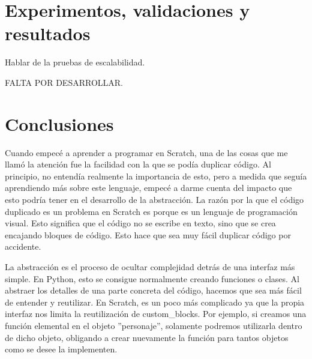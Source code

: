\documentclass[a4paper, 12pt]{book}
\begin{document}



\cleardoublepage
\chapter{Experimentos, validaciones y resultados}


Hablar de la pruebas de escalabilidad. 

FALTA POR DESARROLLAR.


\cleardoublepage
\chapter{Conclusiones}
\label{chap:conclusiones}

Cuando empecé a aprender a programar en Scratch, una de las cosas que me llamó la atención fue la facilidad con la que se podía duplicar código. Al principio, no entendía realmente la importancia de esto, pero a medida que seguía aprendiendo más sobre este lenguaje, empecé a darme cuenta del impacto que esto podría tener en el desarrollo de la abstracción. La razón por la que el código duplicado es un problema en Scratch es porque es un lenguaje de programación visual. Esto significa que el código no se escribe en texto, sino que se crea encajando bloques de código. Esto hace que sea muy fácil duplicar código por accidente.

La abstracción es el proceso de ocultar complejidad detrás de una interfaz más simple. En Python, esto se consigue normalmente creando funciones o clases. Al abstraer los detalles de una parte concreta del código, hacemos que sea más fácil de entender y reutilizar. En Scratch, es un poco más complicado ya que la propia interfaz nos limita la reutilización de custom\_blocks. Por ejemplo, si creamos una función elemental en el objeto ''personaje'', solamente podremos utilizarla dentro de dicho objeto, obligando a crear nuevamente la función para tantos objetos como se desee la implementen.
\end{document}
